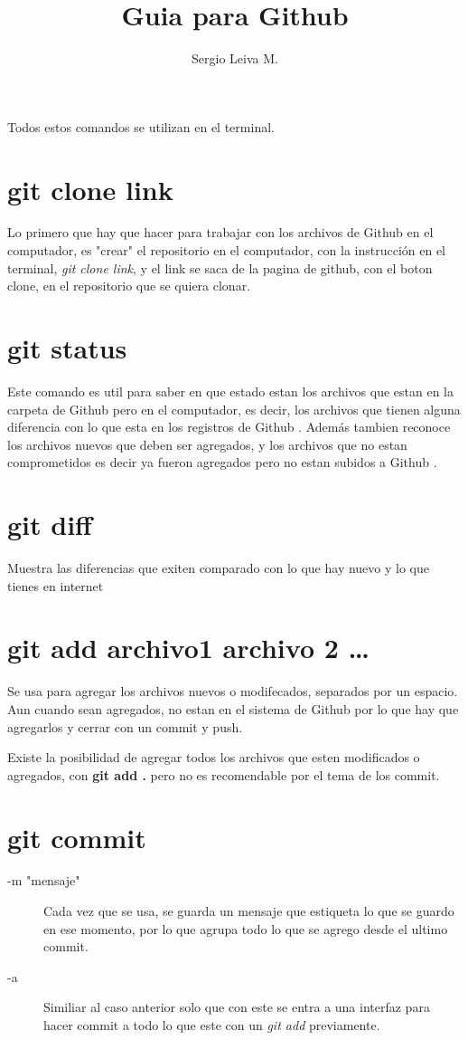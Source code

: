 \documentclass[letter,10pt]{article}
\newcommand{\g}{Github }
\begin{document}
\author{Sergio Leiva M.}
\title{\textbf{Guia para \g}}
\maketitle

Todos estos comandos se utilizan en el terminal.

\section{git clone link}
 Lo primero que hay que hacer para trabajar con los archivos de \g  en el computador, es "crear" el repositorio en el computador, con la instrucción en el terminal, \textit{git clone link}, y el link se saca de la pagina de github, con el boton clone, en el repositorio que se quiera clonar.

\section{git status}
 Este comando es util para saber en que estado estan los archivos que estan en la carpeta de \g pero en el computador, es decir, los archivos que tienen alguna diferencia con lo que esta en los registros de \g. Además tambien reconoce los archivos nuevos que deben ser agregados, y los archivos que no estan comprometidos es decir ya fueron agregados pero no estan subidos a \g.
 
\section{git diff}

 Muestra las diferencias que exiten comparado con lo que hay nuevo y lo que tienes en internet
 
\section{git add archivo1 archivo 2 \ldots} 
 
 Se usa para agregar los archivos nuevos o modifecados, separados por un espacio. Aun cuando sean agregados, no estan en el sistema de \g por lo que hay que agregarlos y cerrar con un commit y push.
 
 Existe la posibilidad de agregar todos los archivos que esten modificados o agregados, con \textbf{git add . } pero no es recomendable por el tema de los commit.
 
\section{git commit} 
\begin{description}
\item [-m "mensaje"] Cada vez que se usa, se guarda un mensaje que estiqueta lo que se guardo en ese momento, por lo que agrupa todo lo que se agrego desde el ultimo commit. 
\item[-a] Similiar al caso anterior solo que con este se entra a una interfaz para hacer commit a todo lo que este con un \textit{git add} previamente.
\end{description}
\end{document}
